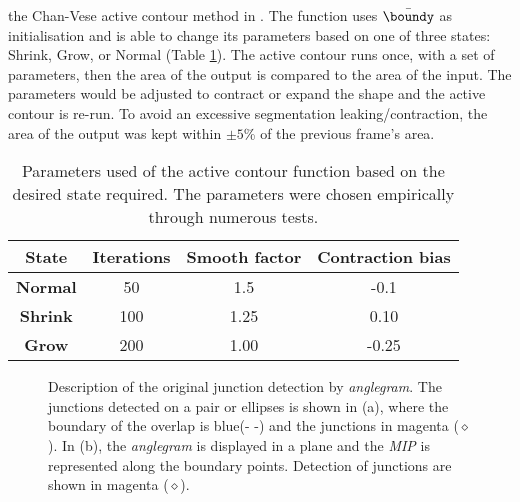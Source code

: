 the Chan-Vese active contour \cite{chanvese,whitaker1998} method in \matlab.
The function uses
$\bar{\boundy}$ as initialisation
and is able to change its parameters based on one of three
states: Shrink, Grow, or Normal (Table \ref{tab:acparams}).
The active contour runs once, with a set of parameters,
then the area of the output is compared to the area of the input.
The parameters would be adjusted to contract or expand the shape
and the active contour is re-run.
To avoid an excessive segmentation leaking/contraction,
the area of the output was kept within $\pm5$\% of the previous
frame's area.
\vspace{-0.5em}
\begin{table}[hbpt]
    \centering
    \caption{\small
    Parameters used of the active contour function based on the desired
    state required. The parameters were chosen empirically through numerous
    tests.
    }
    \begin{tabular}{c|ccc}
    \hline
    State	& Iterations &	Smooth factor &	Contraction bias\\
    \hline
    \textbf{Normal} & 50 & 1.5 & -0.1 \\
    \textbf{Shrink} & 100 & 1.25 & 0.10 \\
    \textbf{Grow} & 200 & 1.00 & -0.25 \\
    \hline
    \end{tabular}
    \label{tab:acparams}
\end{table}
\vspace{-2em}
\begin{figure}[hbpt]
    \centering
    \caption{
    \small
    Description of the original junction detection by \emph{anglegram}.
    The junctions detected on a pair or ellipses is shown in (a),
    where the boundary of the overlap is blue(- -) and the
    junctions in magenta ($\diamond$). In (b), the \emph{anglegram} is
    displayed in a plane and the \emph{MIP} is represented
    along the boundary points. Detection of junctions are shown in magenta
    ($\diamond$).}
    \label{fig:meth-anglegram}
\end{figure}
\vspace{-1em}
